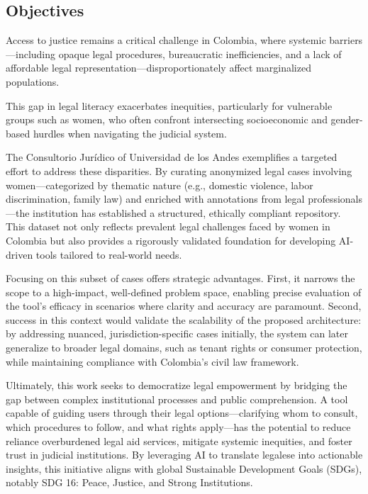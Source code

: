 \subsection{Objectives} 
Access to justice remains a critical challenge in Colombia, where systemic barriers—including 
opaque legal procedures, bureaucratic inefficiencies, and a lack of affordable legal 
representation—disproportionately affect marginalized populations. 


This gap in legal literacy exacerbates inequities, 
particularly for vulnerable groups such as women, who often confront intersecting socioeconomic 
and gender-based hurdles when navigating the judicial system.

The Consultorio Jurídico of Universidad de los Andes exemplifies a targeted effort to address these 
disparities. By curating anonymized legal cases involving women—categorized by thematic nature 
(e.g., domestic violence, labor discrimination, family law) and enriched with annotations 
from legal professionals—the institution has established a structured, ethically compliant repository. 
This dataset not only reflects prevalent legal challenges faced by women in Colombia but also provides a rigorously validated foundation for developing AI-driven tools tailored to real-world needs.

Focusing on this subset of cases offers strategic advantages. First, it narrows the scope to a high-impact, well-defined problem space, enabling precise evaluation of the tool’s efficacy in scenarios where clarity and accuracy are paramount. Second, success in this context would validate the scalability of the proposed architecture: by addressing nuanced, jurisdiction-specific cases initially, the system can later generalize to broader legal domains, such as tenant rights or consumer protection, while maintaining compliance with Colombia’s civil law framework.

Ultimately, this work seeks to democratize legal empowerment by bridging the gap between complex institutional processes and public comprehension. A tool capable of guiding users through their legal options—clarifying whom to consult, which procedures to follow, and what rights apply—has the potential to reduce reliance overburdened legal aid services, mitigate systemic inequities, and foster trust in judicial institutions. By leveraging AI to translate legalese into actionable insights, this initiative aligns with global Sustainable Development Goals (SDGs), notably SDG 16: Peace, Justice, and Strong Institutions.

\endinput